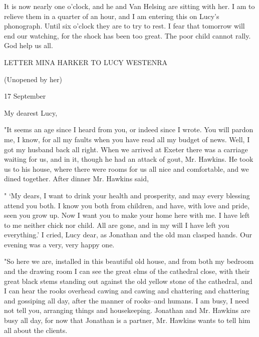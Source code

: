 It is now nearly one o'clock, and he and Van Helsing are sitting with her. I am to relieve them in a quarter of an hour, and I am entering this on Lucy's phonograph. Until six o'clock they are to try to rest. I fear that tomorrow will end our watching, for the shock has been too great. The poor child cannot rally. God help us all. 

LETTER MINA HARKER TO LUCY WESTENRA 

(Unopened by her) 

17 September 

My dearest Lucy, 

"It seems an age since I heard from you, or indeed since I wrote. You will pardon me, I know, for all my faults when you have read all my budget of news. Well, I got my husband back all right. When we arrived at Exeter there was a carriage waiting for us, and in it, though he had an attack of gout, Mr. Hawkins. He took us to his house, where there were rooms for us all nice and comfortable, and we dined together. After dinner Mr. Hawkins said, 

" `My dears, I want to drink your health and prosperity, and may every blessing attend you both. I know you both from children, and have, with love and pride, seen you grow up. Now I want you to make your home here with me. I have left to me neither chick nor child. All are gone, and in my will I have left you everything.' I cried, Lucy dear, as Jonathan and the old man clasped hands. Our evening was a very, very happy one. 

"So here we are, installed in this beautiful old house, and from both my bedroom and the drawing room I can see the great elms of the cathedral close, with their great black stems standing out against the old yellow stone of the cathedral, and I can hear the rooks overhead cawing and cawing and chattering and chattering and gossiping all day, after the manner of rooks--and humans. I am busy, I need not tell you, arranging things and housekeeping. Jonathan and Mr. Hawkins are busy all day, for now that Jonathan is a partner, Mr. Hawkins wants to tell him all about the clients. 

